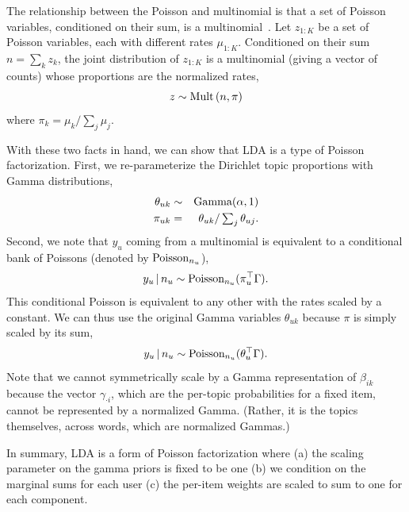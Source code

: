 \documentclass{sig-alternate}
\begin{document}
The relationship between the Poisson and multinomial is that a set of
Poisson variables, conditioned on their sum, is a
multinomial~\cite{Johnson:2005}.  Let $z_{1:K}$ be a set of Poisson
variables, each with different rates $\mu_{1:K}$.  Conditioned on
their sum $n = \sum_k z_k$, the joint distribution of $z_{1:K}$ is a
multinomial (giving a vector of counts) whose proportions are the
normalized rates,
\begin{equation*}
  z \sim \textrm{Mult}\left(n, \pi \right)
\end{equation*}
where $\pi_k = \mu_k / \sum_j \mu_j$.

With these two facts in hand, we can show that LDA is a type of
Poisson factorization.  First, we re-parameterize the Dirichlet topic
proportions with Gamma distributions,
\begin{eqnarray*}
  \theta_{uk} &\sim& \textrm{Gamma}(\alpha, 1) \\
  \pi_{uk} &=& \theta_{uk} / \textstyle \sum_{j} \theta_{uj}.
\end{eqnarray*}
Second, we note that $y_u$ coming from a multinomial is equivalent to
a conditional bank of Poissons (denoted by $\textrm{Poisson}_{n_u}$),
\begin{equation*}
  y_u \,\vert\, n_u \sim \textrm{Poisson}_{n_u}(\pi_u^\top \Gamma).
\end{equation*}
This conditional Poisson is equivalent to any other with the rates
scaled by a constant.  We can thus use the original Gamma variables
$\theta_{uk}$ because $\pi$ is simply scaled by its sum,
\begin{equation*}
  y_u \,\vert\, n_u \sim \textrm{Poisson}_{n_u}(\theta_u^\top \Gamma).
\end{equation*}
Note that we cannot symmetrically scale by a Gamma representation of
$\beta_{ik}$ because the vector $\gamma_{\cdot i}$, which are the
per-topic probabilities for a fixed item, cannot be represented by a
normalized Gamma.  (Rather, it is the topics themselves, across words,
which are normalized Gammas.)

In summary, LDA is a form of Poisson factorization where (a) the
scaling parameter on the gamma priors is fixed to be one (b) we
condition on the marginal sums for each user (c) the per-item weights
are scaled to sum to one for each component.

\end{document}
